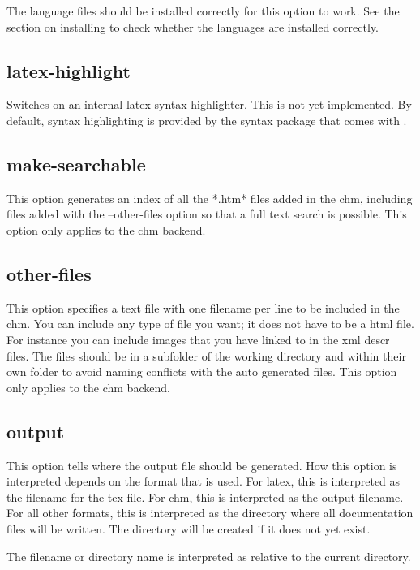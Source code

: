 The language files should be installed correctly for this option to work.
See the section on installing to check whether the languages are installed
correctly.

\subsection{latex-highlight}
\label{suse:latexhighlight}
Switches on an internal latex syntax highlighter. This is not yet
implemented. By default, syntax highlighting is provided by the syntax
package that comes with \fpc.

\subsection{make-searchable}
This option generates an index of all the *.htm* files added in the chm, 
including files added with the --other-files option so that a full text search
is possible. This option only applies to the chm backend.

\subsection{other-files}
\label{suse:other-files}
This option specifies a text file with one filename per line to be included in
the chm. You can include any type of file you want; it does not have to be a
html file. For instance you can include images that you have linked to in the
xml descr files. The files should be in a subfolder of the working directory 
and within their own folder to avoid naming conflicts with the auto generated
files. This option only applies to the chm backend.

\subsection{output}
\label{suse:output}
This option tells  \fpdoc where the output file should be generated. 
How this option is interpreted depends on the format that is used. 
For latex, this is interpreted as the filename for the tex file. 
For chm, this is interpreted as the output filename.
For all other formats, this is interpreted as the directory where all 
documentation files will be written. The directory will be created if 
it does not yet exist.

The filename or directory name is interpreted as relative to the current
directory.

